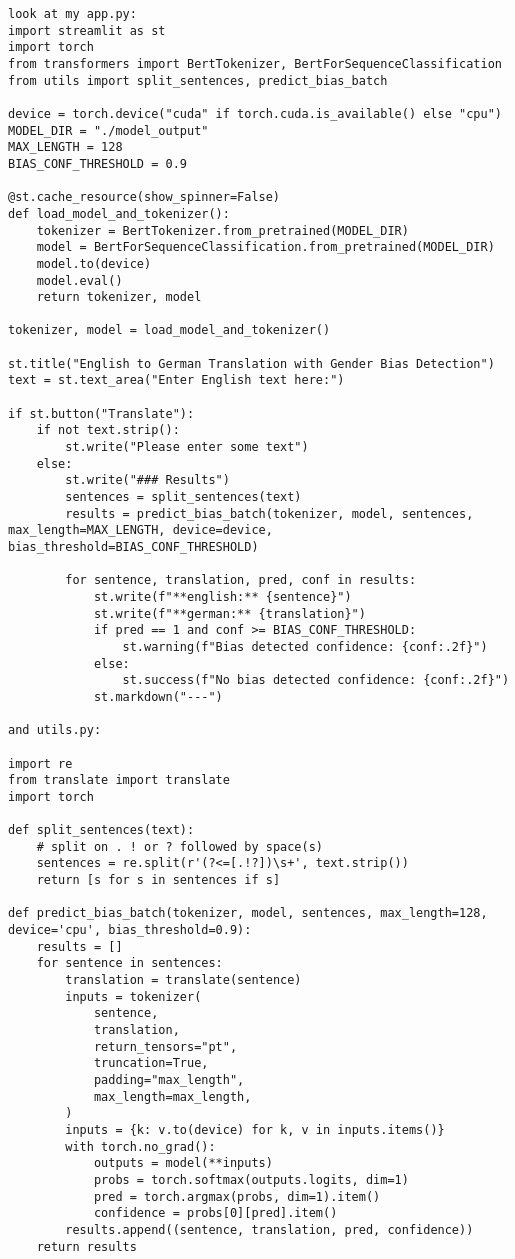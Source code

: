 \begin{lstlisting}
look at my app.py: 
import streamlit as st
import torch
from transformers import BertTokenizer, BertForSequenceClassification
from utils import split_sentences, predict_bias_batch

device = torch.device("cuda" if torch.cuda.is_available() else "cpu")
MODEL_DIR = "./model_output" 
MAX_LENGTH = 128
BIAS_CONF_THRESHOLD = 0.9

@st.cache_resource(show_spinner=False)
def load_model_and_tokenizer():
    tokenizer = BertTokenizer.from_pretrained(MODEL_DIR)
    model = BertForSequenceClassification.from_pretrained(MODEL_DIR)
    model.to(device)
    model.eval()
    return tokenizer, model

tokenizer, model = load_model_and_tokenizer()

st.title("English to German Translation with Gender Bias Detection")
text = st.text_area("Enter English text here:")

if st.button("Translate"):
    if not text.strip():
        st.write("Please enter some text")
    else:
        st.write("### Results")
        sentences = split_sentences(text)
        results = predict_bias_batch(tokenizer, model, sentences, max_length=MAX_LENGTH, device=device, bias_threshold=BIAS_CONF_THRESHOLD)

        for sentence, translation, pred, conf in results:
            st.write(f"**english:** {sentence}")
            st.write(f"**german:** {translation}")
            if pred == 1 and conf >= BIAS_CONF_THRESHOLD:
                st.warning(f"Bias detected confidence: {conf:.2f}")
            else:
                st.success(f"No bias detected confidence: {conf:.2f}")
            st.markdown("---")

and utils.py:

import re
from translate import translate
import torch

def split_sentences(text):
    # split on . ! or ? followed by space(s)
    sentences = re.split(r'(?<=[.!?])\s+', text.strip())
    return [s for s in sentences if s]

def predict_bias_batch(tokenizer, model, sentences, max_length=128, device='cpu', bias_threshold=0.9):
    results = []
    for sentence in sentences:
        translation = translate(sentence)
        inputs = tokenizer(
            sentence,
            translation,
            return_tensors="pt",
            truncation=True,
            padding="max_length",
            max_length=max_length,
        )
        inputs = {k: v.to(device) for k, v in inputs.items()}
        with torch.no_grad():
            outputs = model(**inputs)
            probs = torch.softmax(outputs.logits, dim=1)
            pred = torch.argmax(probs, dim=1).item()
            confidence = probs[0][pred].item()
        results.append((sentence, translation, pred, confidence))
    return results


\end{lstlisting}
